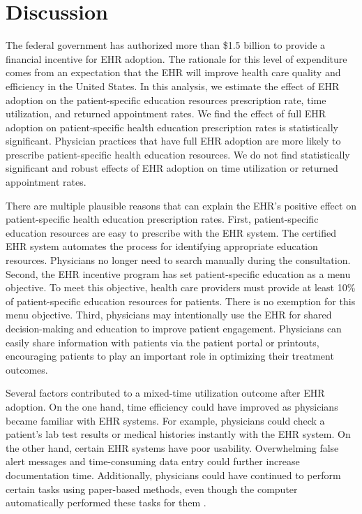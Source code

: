 \documentclass[12pt]{report}
\begin{document}
\chapter{Discussion}

\label{chapter:discussion}
The federal government has authorized more than \$1.5 billion to provide a financial incentive for EHR adoption. The rationale for this level of expenditure comes from an expectation that the EHR will improve health care quality and efficiency in the United States. In this analysis, we estimate the effect of EHR adoption on the patient-specific education resources prescription rate, time utilization, and returned appointment rates. We find the effect of full EHR adoption on patient-specific health education prescription rates is statistically significant. Physician practices that have full EHR adoption are more likely to prescribe patient-specific health education resources. We do not find statistically significant and robust effects of EHR adoption on time utilization or returned appointment rates.

There are multiple plausible reasons that can explain the EHR's positive effect on patient-specific health education prescription rates. First, patient-specific education resources are easy to prescribe with the EHR system. The certified EHR system automates the process for identifying appropriate education resources. Physicians no longer need to search manually during the consultation. Second, the EHR incentive program has set patient-specific education as a menu objective. To meet this objective, health care providers must provide at least 10\% of  patient-specific education resources for patients. There is no exemption for this menu objective. Third, physicians may intentionally use the EHR for shared decision-making and education to improve patient engagement. Physicians can easily share information with patients via the patient portal or printouts, encouraging patients to play an important role in optimizing their treatment outcomes.

Several factors contributed to a mixed-time utilization outcome after EHR adoption. On the one hand, time efficiency could have improved as physicians became familiar with EHR systems. For example, physicians could check a patient's lab test results or medical histories instantly with the EHR system. On the other hand, certain EHR systems have poor usability. Overwhelming false alert messages and time-consuming data entry could further increase documentation time. Additionally, physicians could have continued to perform certain tasks using paper-based methods, even though the computer automatically performed these tasks for them \citep{overhage2001controlled}.
\end{document}
